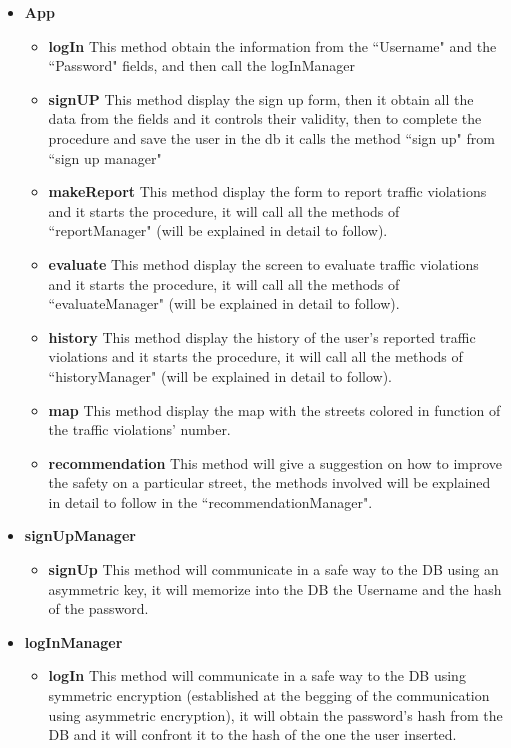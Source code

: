 \documentclass[12pt,a4paper]{report}
\begin{document}
					\begin{itemize}
						\item \textbf{App}
						\begin{itemize}
							\item \textbf{logIn} This method obtain the information from the ``Username" and the
								``Password" fields, and then call the logInManager
							\item \textbf{signUP} This method display the sign up form, then it obtain all the data
								from the fields and it controls their validity, then to complete the procedure and
								save the user in the db it calls the method ``sign up" from  ``sign up manager"
							\item \textbf{makeReport} This method display the form to report traffic violations and
								it starts the procedure, it will call all the methods of ``reportManager"
								(will be explained in detail to follow). 
							\item \textbf{evaluate} This method display the screen to evaluate traffic violations and
								it starts the procedure, it will call all the methods of ``evaluateManager"
								(will be explained in detail to follow).
							\item \textbf{history} This method display the history of the user's reported traffic
								violations and it starts the procedure, it will call all the methods of
								``historyManager" (will be explained in detail to follow).
							\item \textbf{map} This method display the map with the streets colored in function of the
								traffic violations' number.
							\item \textbf{recommendation} This method will give a suggestion on how to improve the
								safety on a particular street, the methods involved will be explained in detail to
								follow in the  ``recommendationManager".
						\end{itemize}
						\item \textbf{signUpManager}
						\begin{itemize}
							\item \textbf{signUp} This method will communicate in a safe way to the DB using an
								asymmetric key, it will memorize into the DB the Username and the hash of the
								password.
						\end{itemize}
						\item \textbf{logInManager}
						\begin{itemize}
							\item \textbf{logIn} This method will communicate in a safe way to the DB using
								symmetric encryption (established at the begging of the communication using
								asymmetric encryption), it will obtain the password's hash from the DB and it will
								confront it to the hash of the one the user inserted.
						\end{itemize}
					\end{itemize}
\end{document}
